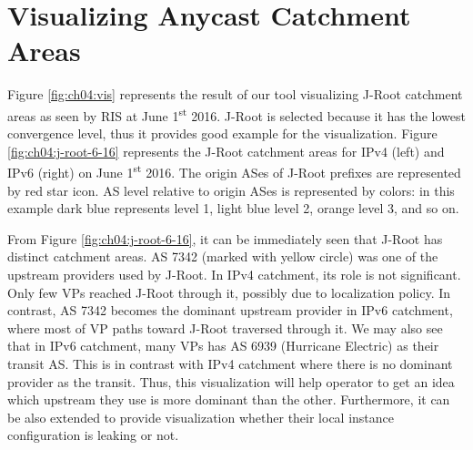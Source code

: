 



\section{Visualizing Anycast Catchment Areas}
\label{ch04:visualizing}
Figure \ref{fig:ch04:vis} represents the result of our tool visualizing J-Root catchment areas as seen by RIS at June 1\textsuperscript{st} 2016. J-Root is selected because it has the lowest convergence level, thus it provides good example for the visualization. Figure \ref{fig:ch04:j-root-6-16} represents the J-Root catchment areas for IPv4 (left) and IPv6 (right) on June 1\textsuperscript{st} 2016. The origin ASes of J-Root prefixes are represented by red star icon. AS level relative to origin ASes is represented by colors: in this example dark blue represents level 1, light blue level 2, orange level 3, and so on. 

From Figure \ref{fig:ch04:j-root-6-16}, it can be immediately seen that J-Root has distinct catchment areas. AS 7342 (marked with yellow circle) was one of the upstream providers used by J-Root. In IPv4 catchment, its role is not significant. Only few VPs reached J-Root through it, possibly due to localization policy. In contrast, AS 7342 becomes the dominant upstream provider in IPv6 catchment, where most of VP paths toward J-Root traversed through it. We may also see that in IPv6 catchment, many VPs has AS 6939 (Hurricane Electric) as their transit AS. This is in contrast with IPv4 catchment where there is no dominant provider as the transit. Thus, this visualization will help operator to get an idea which upstream they use is more dominant than the other. Furthermore, it can be also extended to provide visualization whether their local instance configuration is leaking or not.


